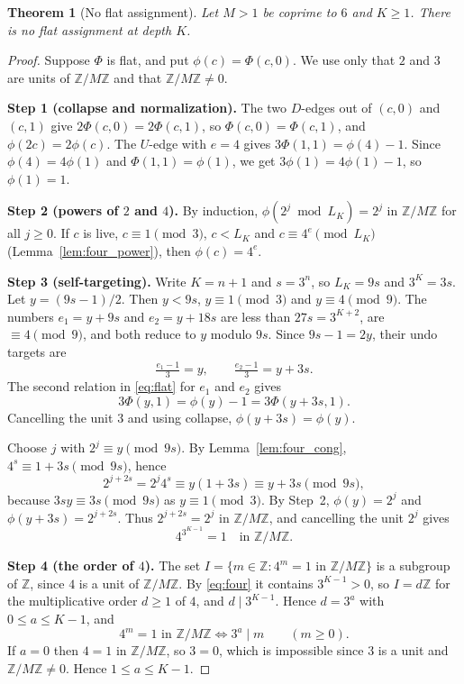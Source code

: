 \documentclass[11pt,reqno,oneside]{amsart}
\theoremstyle{plain}
\newtheorem{theorem}{Theorem}[section]
\theoremstyle{definition}
\numberwithin{equation}{section}
\newcommand{\Z}{\mathbb{Z}}
\newcommand{\ZM}{\Z/M\Z}
\begin{document}
\begin{theorem}[No flat assignment]\label{thm:noflat}
Let $M>1$ be coprime to $6$ and $K\ge1$. There is no flat assignment at depth $K$.
\end{theorem}
\begin{proof}
Suppose $\Phi$ is flat, and put $\phi(c)=\Phi(c,0)$. We use only that $2$ and $3$ are units of $\ZM$ and that $\ZM\neq0$.

\medskip\noindent\textbf{Step 1 (collapse and normalization).} The two $D$-edges out of $(c,0)$ and $(c,1)$ give $2\Phi(c,0)=2\Phi(c,1)$, so $\Phi(c,0)=\Phi(c,1)$, and $\phi(2c)=2\phi(c)$. The $U$-edge with $e=4$ gives $3\Phi(1,1)=\phi(4)-1$. Since $\phi(4)=4\phi(1)$ and $\Phi(1,1)=\phi(1)$, we get $3\phi(1)=4\phi(1)-1$, so $\phi(1)=1$.

\medskip\noindent\textbf{Step 2 (powers of $2$ and $4$).} By induction, $\phi(2^j\bmod L_K)=2^j$ in $\ZM$ for all $j\ge0$. If $c$ is live, $c\equiv1\pmod3$, $c<L_K$ and $c\equiv4^e\pmod{L_K}$ (Lemma~\ref{lem:four_power}), then $\phi(c)=4^e$.

\medskip\noindent\textbf{Step 3 (self-targeting).} Write $K=n+1$ and $s=3^n$, so $L_K=9s$ and $3^K=3s$. Let $y=(9s-1)/2$. Then $y<9s$, $y\equiv1\pmod 3$ and $y\equiv4\pmod9$. The numbers $e_1=y+9s$ and $e_2=y+18s$ are less than $27s=3^{K+2}$, are $\equiv4\pmod9$, and both reduce to $y$ modulo $9s$. Since $9s-1=2y$, their undo targets are
\[
\tfrac{e_1-1}{3}=y,\qquad\tfrac{e_2-1}{3}=y+3s .
\]
The second relation in \eqref{eq:flat} for $e_1$ and $e_2$ gives
\[
3\Phi(y,1)=\phi(y)-1=3\Phi(y+3s,1).
\]
Cancelling the unit $3$ and using collapse, $\phi(y+3s)=\phi(y)$.

Choose $j$ with $2^j\equiv y\pmod{9s}$. By Lemma~\ref{lem:four_cong}, $4^s\equiv1+3s\pmod{9s}$, hence
\[
2^{j+2s}=2^j4^s\equiv y(1+3s)\equiv y+3s\pmod{9s},
\]
because $3sy\equiv3s\pmod{9s}$ as $y\equiv1\pmod 3$. By Step~2, $\phi(y)=2^j$ and $\phi(y+3s)=2^{j+2s}$. Thus $2^{j+2s}=2^j$ in $\ZM$, and cancelling the unit $2^j$ gives
\begin{equation}\label{eq:four}
4^{3^{K-1}}=1\quad\text{in }\ZM .
\end{equation}

\medskip\noindent\textbf{Step 4 (the order of $4$).} The set $I=\{m\in\Z:4^m=1\text{ in }\ZM\}$ is a subgroup of $\Z$, since $4$ is a unit of $\ZM$. By \eqref{eq:four} it contains $3^{K-1}>0$, so $I=d\Z$ for the multiplicative order $d\ge 1$ of $4$, and $d\mid3^{K-1}$. Hence $d=3^a$ with $0\le a\le K-1$, and
\begin{equation}\label{eq:order}
4^m=1\text{ in }\ZM\iff3^a\mid m\qquad(m\ge0).
\end{equation}
If $a=0$ then $4=1$ in $\ZM$, so $3=0$, which is impossible since $3$ is a unit and $\ZM\ne0$. Hence $1\le a\le K-1$.


\end{proof}
\end{document}
